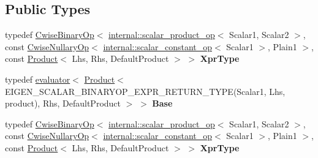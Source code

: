 \subsection*{Public Types}
\begin{DoxyCompactItemize}
\item 
\mbox{\label{struct_eigen_1_1internal_1_1evaluator_3_01_cwise_binary_op_3_01internal_1_1scalar__product__op_321f22566d2663743c7f9d1c3e4e03f69_a518128307c011806fa4f530d8d1c7a96}} 
typedef \hyperlink{group___core___module_class_eigen_1_1_cwise_binary_op}{Cwise\+Binary\+Op}$<$ \hyperlink{struct_eigen_1_1internal_1_1scalar__product__op}{internal\+::scalar\+\_\+product\+\_\+op}$<$ Scalar1, Scalar2 $>$, const \hyperlink{group___core___module_class_eigen_1_1_cwise_nullary_op}{Cwise\+Nullary\+Op}$<$ \hyperlink{struct_eigen_1_1internal_1_1scalar__constant__op}{internal\+::scalar\+\_\+constant\+\_\+op}$<$ Scalar1 $>$, Plain1 $>$, const \hyperlink{group___core___module_class_eigen_1_1_product}{Product}$<$ Lhs, Rhs, Default\+Product $>$ $>$ {\bfseries Xpr\+Type}
\item 
\mbox{\label{struct_eigen_1_1internal_1_1evaluator_3_01_cwise_binary_op_3_01internal_1_1scalar__product__op_321f22566d2663743c7f9d1c3e4e03f69_a9626a0e1d13b8213c27d2a4988280ac3}} 
typedef \hyperlink{struct_eigen_1_1internal_1_1evaluator}{evaluator}$<$ \hyperlink{group___core___module_class_eigen_1_1_product}{Product}$<$ E\+I\+G\+E\+N\+\_\+\+S\+C\+A\+L\+A\+R\+\_\+\+B\+I\+N\+A\+R\+Y\+O\+P\+\_\+\+E\+X\+P\+R\+\_\+\+R\+E\+T\+U\+R\+N\+\_\+\+T\+Y\+PE(Scalar1, Lhs, product), Rhs, Default\+Product $>$ $>$ {\bfseries Base}
\item 
\mbox{\label{struct_eigen_1_1internal_1_1evaluator_3_01_cwise_binary_op_3_01internal_1_1scalar__product__op_321f22566d2663743c7f9d1c3e4e03f69_a518128307c011806fa4f530d8d1c7a96}} 
typedef \hyperlink{group___core___module_class_eigen_1_1_cwise_binary_op}{Cwise\+Binary\+Op}$<$ \hyperlink{struct_eigen_1_1internal_1_1scalar__product__op}{internal\+::scalar\+\_\+product\+\_\+op}$<$ Scalar1, Scalar2 $>$, const \hyperlink{group___core___module_class_eigen_1_1_cwise_nullary_op}{Cwise\+Nullary\+Op}$<$ \hyperlink{struct_eigen_1_1internal_1_1scalar__constant__op}{internal\+::scalar\+\_\+constant\+\_\+op}$<$ Scalar1 $>$, Plain1 $>$, const \hyperlink{group___core___module_class_eigen_1_1_product}{Product}$<$ Lhs, Rhs, Default\+Product $>$ $>$ {\bfseries Xpr\+Type}

\end{DoxyCompactItemize}
